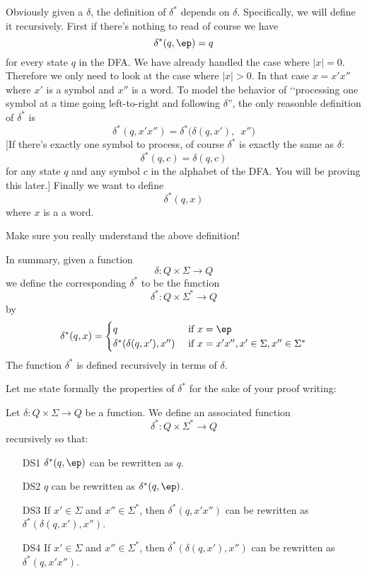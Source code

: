 Obviously given a $\delta$, the definition of $\delta^*$ depends on $\delta$.
Specifically, we will define it recursively.
First if there's nothing to read of course we have
\[
\delta^*(q, \ep) = q
\]
for every state $q$ in the DFA.
We have already handled the case where $|x| = 0$.
Therefore we only need to look at the case where $|x| > 0$.
In that case $x = x'x''$ where $x'$ is a symbol and $x''$ is a word.
To model the behavior of 
\lq\lq processing one symbol at a time going left-to-right
and following $\delta$'', the only reasonble definition of $\delta^*$ is
\[
\delta^*(q, x'x'') = \delta^* \biggl( \delta(q,x'), \,\,\, x''\biggr)
\]
[If there's exactly one symbol to process, of course $\delta^*$ is exactly
the same as $\delta$:
\[
\delta^*(q, c) = \delta(q, c)
\]
for any state $q$ and any symbol $c$ in the alphabet of the DFA.
You will be proving this later.]
Finally we want to define
\[
\delta^*(q, x)
\]
where $x$ is a a word.

Make sure you really understand the above definition!

In summary, given a function
\[
\delta : Q \times \Sigma \rightarrow Q
\]
we define the corresponding $\delta^*$ to be the function
\[
\delta^* : Q \times \Sigma^* \rightarrow Q
\]
by
\[
\delta^*(q, x) = 
\begin{cases}
q            & \text{ if $x = \ep$} \\
\delta^* ( \delta(q,x'), x'')
             & \text{ if } x = x'x'',x' \in \Sigma, x'' \in \Sigma^* \\
\end{cases}
\]
The function $\delta^*$ is defined recursively in terms of $\delta$.

Let me state formally the properties of $\delta^*$ for the sake of your
proof writing:

Let $\delta : Q \times \Sigma \rightarrow Q$ be a function.
We define an associated function
\[
\delta^* : Q \times \Sigma^* \rightarrow Q
\]
recursively so that:
\begin{enumerate}
\item[DS1] $\delta^*(q, \ep)$ can be rewritten as $q$.
\item[DS2] $q$ can be rewritten as $\delta^*(q, \ep)$.
\item[DS3] If $x' \in \Sigma$ and $x'' \in \Sigma^*$, then
            $\delta^*(q, x'x'')$ can be rewritten as 
          $\delta^*(\delta(q, x'), x'')$.
\item[DS4] If $x' \in \Sigma$ and $x'' \in \Sigma^*$, then
          $\delta^*(\delta(q, x'), x'')$
          can be rewritten as 
          $\delta^*(q, x'x'')$.
\end{enumerate}

